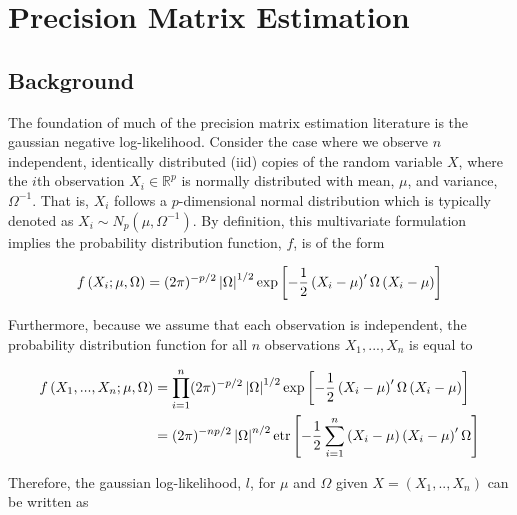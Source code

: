 \documentclass[11pt,]{report}
\theoremstyle{definition}
\theoremstyle{definition}
\theoremstyle{definition}
\theoremstyle{remark}
\begin{document}
\hypertarget{precision-matrix-estimation}{%
\chapter{Precision Matrix Estimation}\label{precision-matrix-estimation}}

\hypertarget{background}{%
\section{Background}\label{background}}

The foundation of much of the precision matrix estimation literature is the gaussian negative log-likelihood. Consider the case where we observe \(n\) independent, identically distributed (iid) copies of the random variable \(X\), where the \(i\)th observation \(X_{i} \in \mathbb{R}^{p}\) is normally distributed with mean, \(\mu\), and variance, \(\Omega^{-1}\). That is, \(X_{i}\) follows a \(p\)-dimensional normal distribution which is typically denoted as \(X_{i} \sim N_{p}\left( \mu, \Omega^{-1} \right)\). By definition, this multivariate formulation implies the probability distribution function, \(f\), is of the form

\begin{equation} 
  f\left(X_{i}; \mu, \Omega\right) = (2\pi)^{-p/2}\left| \Omega \right|^{1/2}\exp\left[ -\frac{1}{2}\left( X_{i} - \mu \right)'\Omega\left( X_{i} - \mu \right) \right] 
\label{eq:normallikone}\notag
\end{equation}

Furthermore, because we assume that each observation is independent, the probability distribution function for all \(n\) observations \(X_{1}, ..., X_{n}\) is equal to

\begin{equation} 
\begin{split}
  f\left(X_{1}, ..., X_{n}; \mu, \Omega\right) &= \prod_{i = 1}^{n}(2\pi)^{-p/2}\left| \Omega \right|^{1/2}\exp\left[ -\frac{1}{2}\left( X_{i} - \mu \right)'\Omega\left( X_{i} - \mu \right) \right] \\
  &= (2\pi)^{-np/2}\left| \Omega \right|^{n/2}\mbox{etr}\left[ -\frac{1}{2}\sum_{i = 1}^{n}\left( X_{i} - \mu \right)\left( X_{i} - \mu \right)'\Omega \right]
\end{split}
\label{eq:normallik}\notag
\end{equation}

Therefore, the gaussian log-likelihood, \(l\), for \(\mu\) and \(\Omega\) given \(X = (X_{1}, .., X_{n})\) can be written as
\end{document}
